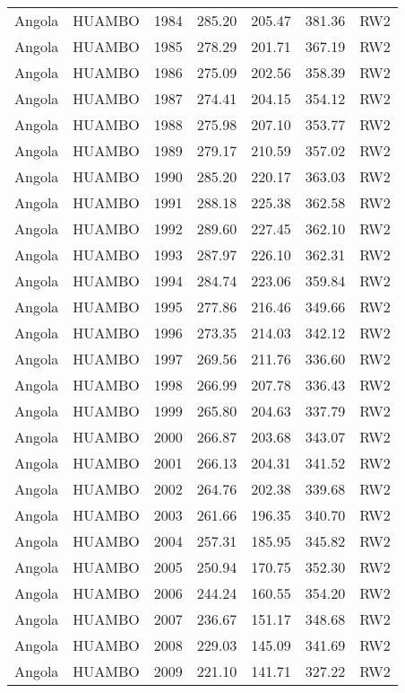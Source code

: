 \begin{longtable}{lllrrrl}
  Angola & HUAMBO & 1984 & 285.20 & 205.47 & 381.36 & RW2 \\ 
  Angola & HUAMBO & 1985 & 278.29 & 201.71 & 367.19 & RW2 \\ 
  Angola & HUAMBO & 1986 & 275.09 & 202.56 & 358.39 & RW2 \\ 
  Angola & HUAMBO & 1987 & 274.41 & 204.15 & 354.12 & RW2 \\ 
  Angola & HUAMBO & 1988 & 275.98 & 207.10 & 353.77 & RW2 \\ 
  Angola & HUAMBO & 1989 & 279.17 & 210.59 & 357.02 & RW2 \\ 
  Angola & HUAMBO & 1990 & 285.20 & 220.17 & 363.03 & RW2 \\ 
  Angola & HUAMBO & 1991 & 288.18 & 225.38 & 362.58 & RW2 \\ 
  Angola & HUAMBO & 1992 & 289.60 & 227.45 & 362.10 & RW2 \\ 
  Angola & HUAMBO & 1993 & 287.97 & 226.10 & 362.31 & RW2 \\ 
  Angola & HUAMBO & 1994 & 284.74 & 223.06 & 359.84 & RW2 \\ 
  Angola & HUAMBO & 1995 & 277.86 & 216.46 & 349.66 & RW2 \\ 
  Angola & HUAMBO & 1996 & 273.35 & 214.03 & 342.12 & RW2 \\ 
  Angola & HUAMBO & 1997 & 269.56 & 211.76 & 336.60 & RW2 \\ 
  Angola & HUAMBO & 1998 & 266.99 & 207.78 & 336.43 & RW2 \\ 
  Angola & HUAMBO & 1999 & 265.80 & 204.63 & 337.79 & RW2 \\ 
  Angola & HUAMBO & 2000 & 266.87 & 203.68 & 343.07 & RW2 \\ 
  Angola & HUAMBO & 2001 & 266.13 & 204.31 & 341.52 & RW2 \\ 
  Angola & HUAMBO & 2002 & 264.76 & 202.38 & 339.68 & RW2 \\ 
  Angola & HUAMBO & 2003 & 261.66 & 196.35 & 340.70 & RW2 \\ 
  Angola & HUAMBO & 2004 & 257.31 & 185.95 & 345.82 & RW2 \\ 
  Angola & HUAMBO & 2005 & 250.94 & 170.75 & 352.30 & RW2 \\ 
  Angola & HUAMBO & 2006 & 244.24 & 160.55 & 354.20 & RW2 \\ 
  Angola & HUAMBO & 2007 & 236.67 & 151.17 & 348.68 & RW2 \\ 
  Angola & HUAMBO & 2008 & 229.03 & 145.09 & 341.69 & RW2 \\ 
  Angola & HUAMBO & 2009 & 221.10 & 141.71 & 327.22 & RW2 \\ 

\end{longtable}
